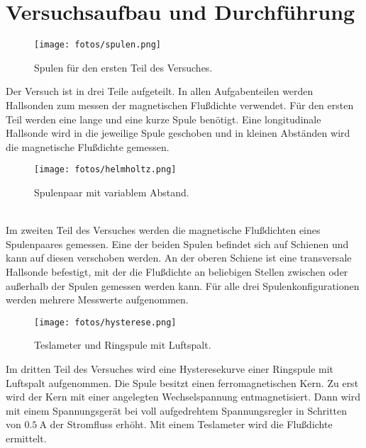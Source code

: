 \section{Versuchsaufbau und Durchführung}
\label{sec:Durchführung}

\begin{figure}[h!]
        \centering
        \texttt{[image: fotos/spulen.png]}
        \caption{Spulen für den ersten Teil des Versuches.\cite{V308}}
        \label{fig:spulen}
\end{figure}
Der Versuch ist in drei Teile aufgeteilt. In allen Aufgabenteilen werden Hallsonden zum messen der magnetischen Flußdichte verwendet.
Für den ersten Teil werden eine lange und eine kurze Spule benötigt. Eine longitudinale Hallsonde wird in die jeweilige Spule geschoben 
und in kleinen Abständen wird die magnetische Flußdichte gemessen.
\\
\begin{figure}[h!]
    \centering
    \texttt{[image: fotos/helmholtz.png]}
    \caption{Spulenpaar mit variablem Abstand.\cite{V308}}
    \label{fig:helmholtz}
\end{figure}
\\
Im zweiten Teil des Versuches werden die magnetische Flußdichten eines Spulenpaares gemessen. Eine der beiden Spulen befindet sich auf Schienen 
und kann auf diesen verschoben werden. An der oberen Schiene ist eine transversale Hallsonde befestigt, mit der die Flußdichte an beliebigen 
Stellen zwischen oder außerhalb der Spulen gemessen werden kann. Für alle drei Spulenkonfigurationen werden mehrere Messwerte aufgenommen.
\\
\begin{figure}
    \centering
    \texttt{[image: fotos/hysterese.png]}
    \caption{Teslameter und Ringspule mit Luftspalt.\cite{V308}}
    \label{fig:ringspule}
\end{figure}
Im dritten Teil des Versuches wird eine Hysteresekurve einer Ringspule mit Luftspalt aufgenommen. Die Spule besitzt einen ferromagnetischen Kern.
Zu erst wird der Kern mit einer angelegten Wechselspannung entmagnetisiert. Dann wird mit einem Spannungsgerät bei voll aufgedrehtem Spannungsregler in Schritten von 
$\SI{0.5}{\ampere}$ der Stromfluss erhöht. Mit einem Teslameter wird die Flußdichte ermittelt.
\newpage
